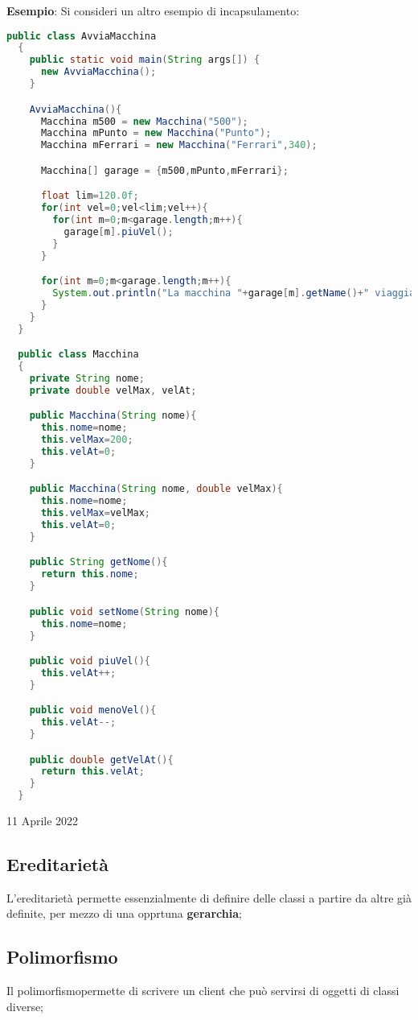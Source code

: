 \documentclass[a4paper]{extarticle}
\begin{document}
\vspace{1em}
\noindent
\textbf{Esempio}: Si consideri un altro esempio di incapsulamento:

\vspace{0.5em}
\noindent
\begin{lstlisting}[language=Java, caption=Esempio esteso di incapsulamento in Java]
  public class AvviaMacchina
  {
    public static void main(String args[]) {
      new AvviaMacchina();
    }

    AvviaMacchina(){
      Macchina m500 = new Macchina("500");
      Macchina mPunto = new Macchina("Punto");
      Macchina mFerrari = new Macchina("Ferrari",340);

      Macchina[] garage = {m500,mPunto,mFerrari};

      float lim=120.0f;
      for(int vel=0;vel<lim;vel++){
        for(int m=0;m<garage.length;m++){
          garage[m].piuVel();
        }
      }

      for(int m=0;m<garage.length;m++){
        System.out.println("La macchina "+garage[m].getName()+" viaggia a "+garage[m].velAt()+"km/h");
      }
    }
  }

  public class Macchina
  {
    private String nome;
    private double velMax, velAt;

    public Macchina(String nome){
      this.nome=nome;
      this.velMax=200;
      this.velAt=0;
    }

    public Macchina(String nome, double velMax){
      this.nome=nome;
      this.velMax=velMax;
      this.velAt=0;
    }

    public String getNome(){
      return this.nome;
    }

    public void setNome(String nome){
      this.nome=nome;
    }

    public void piuVel(){
      this.velAt++;
    }

    public void menoVel(){
      this.velAt--;
    }

    public double getVelAt(){
      return this.velAt;
    }
  }
\end{lstlisting}

\newpage
\noindent
\begin{center}
   11 Aprile 2022
\end{center}
\subsection{Ereditarietà}
L'ereditarietà permette essenzialmente di definire delle classi a partire da altre già definite, per mezzo di una opprtuna \textbf{gerarchia};


\vspace{1em}
\noindent
\subsection{Polimorfismo}
Il polimorfismopermette di scrivere un client che può servirsi di oggetti di classi diverse;
\end{document}
